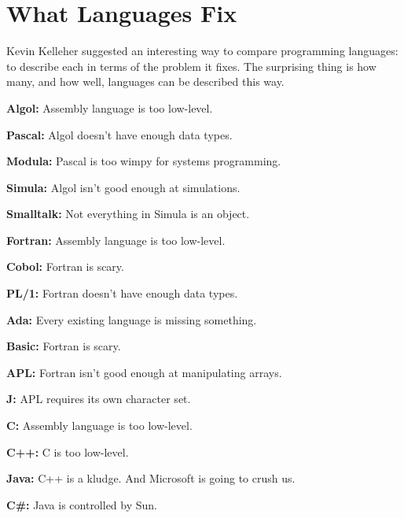 \chapter{What Languages Fix}


            
              
                


                    Kevin Kelleher suggested an interesting way to compare
                    programming languages: to describe each in terms of the
                    problem it fixes. The surprising thing is how many, and how
                    well, languages can be described this way.


                  


                  
                    \textbf{Algol:} Assembly language is too low-level.

\textbf{Pascal:}
                    Algol doesn't have enough data types.

\textbf{Modula:}
                    Pascal is too wimpy for systems programming.


                    \textbf{Simula:} Algol isn't good enough at simulations.

\textbf{Smalltalk:}
                    Not everything in Simula is an object.

\textbf{Fortran:}
                    Assembly language is too low-level.

\textbf{Cobol:}
                    Fortran is scary.

\textbf{PL/1:} Fortran doesn't
                    have enough data types.

\textbf{Ada:} Every
                    existing language is missing something.

\textbf{Basic:}
                    Fortran is scary.

\textbf{APL:} Fortran isn't good
                    enough at manipulating arrays.

\textbf{J:} APL
                    requires its own character set.

\textbf{C:}
                    Assembly language is too low-level.

\textbf{C++:} C
                    is too low-level.

\textbf{Java:} C++ is a kludge.
                    And Microsoft is going to crush us.

\textbf{C\#:}
                    Java is controlled by Sun.
                    

